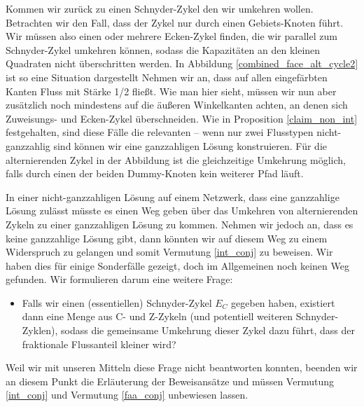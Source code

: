 \begin{example}
Kommen wir zurück zu einen Schnyder-Zykel den wir umkehren wollen. Betrachten wir den Fall, dass der Zykel nur durch einen Gebiets-Knoten führt. Wir müssen also einen oder mehrere Ecken-Zykel finden, die wir parallel zum Schnyder-Zykel umkehren können, sodass die Kapazitäten an den kleinen Quadraten nicht überschritten werden. In Abbildung \ref{combined_face_alt_cycle2} ist so eine Situation dargestellt Nehmen wir an, dass auf allen eingefärbten Kanten Fluss mit Stärke 1/2 fließt. Wie man hier sieht, müssen wir nun aber zusätzlich noch mindestens auf die äußeren Winkelkanten achten, an denen sich Zuweisungs- und Ecken-Zykel überschneiden. Wie in Proposition \ref{claim_non_int} festgehalten, sind diese Fälle die relevanten -- wenn nur zwei Flusstypen nicht-ganzzahlig sind können wir eine ganzzahligen Lösung konstruieren. Für die alternierenden Zykel in der Abbildung ist die gleichzeitige Umkehrung möglich, falls durch einen der beiden Dummy-Knoten kein weiterer Pfad läuft.
\end{example}

In einer nicht-ganzzahligen Lösung auf einem Netzwerk, dass eine ganzzahlige Lösung zulässt müsste es einen Weg geben über das Umkehren von alternierenden Zykeln zu einer ganzzahligen Lösung zu kommen. Nehmen wir jedoch an, dass es keine ganzzahlige Lösung gibt, dann könnten wir auf diesem Weg zu einem Widerspruch zu gelangen und somit Vermutung \ref{int_conj} zu beweisen. Wir haben dies für einige Sonderfälle gezeigt, doch im Allgemeinen noch keinen Weg gefunden. Wir formulieren darum eine weitere Frage:
\begin{itemize}
\item Falls wir einen (essentiellen) Schnyder-Zykel $E_C$ gegeben haben, existiert dann eine Menge aus C- und Z-Zykeln (und potentiell weiteren Schnyder-Zyklen), sodass die gemeinsame Umkehrung dieser Zykel dazu führt, dass der fraktionale Flussanteil kleiner wird?
\end{itemize}
Weil wir mit unseren Mitteln diese Frage nicht beantworten konnten, beenden wir an diesem Punkt die Erläuterung der Beweisansätze und müssen Vermutung \ref{int_conj} und Vermutung \ref{faa_conj} unbewiesen lassen.
